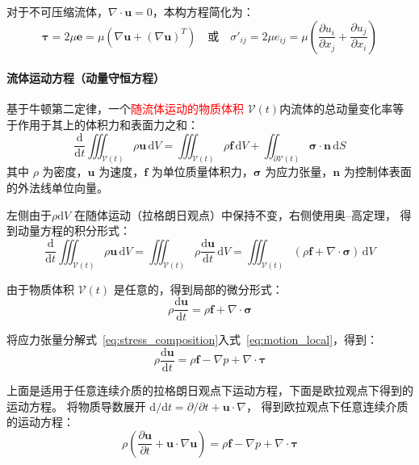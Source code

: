 对于不可压缩流体，$\nabla \cdot \mathbf{u} = 0$，本构方程简化为：
\begin{equation}
\boldsymbol{\tau} = 2\mu \mathbf{e} = \mu \left( \nabla \mathbf{u} + (\nabla \mathbf{u})^T \right)
\quad \text{或} \quad
\sigma'_{ij} = 2\mu e_{ij} =\mu \left( \frac{\partial u_i}{\partial x_j} + \frac{\partial u_j}{\partial x_i} \right)
\end{equation}

\paragraph{流体运动方程（动量守恒方程）}
基于牛顿第二定律，一个\textcolor{red}{随流体运动的物质体积} $\mathcal{V}(t)$内流体的总动量变化率等于作用于其上的体积力和表面力之和：
\begin{equation}
\frac{\mathrm{d}}{\mathrm{d}t} \iiint_{\mathcal{V}(t)} \rho \mathbf{u} \,\mathrm{d}V 
= \iiint_{\mathcal{V}(t)} \rho \mathbf{f} \,\mathrm{d}V + \iint_{\partial \mathcal{V}(t)} \boldsymbol{\sigma} \cdot \mathbf{n} \,\mathrm{d}S
\end{equation}
其中 $\rho$ 为密度，$\mathbf{u}$ 为速度，$\mathbf{f}$ 为单位质量体积力，$\boldsymbol{\sigma}$ 为应力张量，$\mathbf{n}$ 为控制体表面的外法线单位向量。

左侧由于$\rho \mathrm{d}V$ 在随体运动（拉格朗日观点）中保持不变，右侧使用奥--高定理，
得到动量方程的积分形式：
\begin{equation}
\frac{\mathrm{d}}{\mathrm{d}t} \iiint_{\mathcal{V}(t)} \rho \mathbf{u} \,\mathrm{d}V 
= \boxed{\iiint_{\mathcal{V}(t)} \rho \frac{\mathrm{d}\mathbf{u}}{\mathrm{d}t} \,\mathrm{d}V
= \iiint_{\mathcal{V}(t)} \left(\rho \mathbf{f} + \nabla \cdot \boldsymbol{\sigma}\right) \,\mathrm{d}V
}\end{equation}

由于物质体积 $\mathcal{V}(t)$ 是任意的，得到局部的微分形式：
\begin{equation}
\rho \frac{\mathrm{d}\mathbf{u}}{\mathrm{d}t} 
= \rho \mathbf{f} + \nabla \cdot \boldsymbol{\sigma}
\label{eq:motion_local}
\end{equation}

将应力张量分解式~\eqref{eq:stress_composition}入式~\eqref{eq:motion_local}，得到：
\begin{equation}
\rho \frac{\mathrm{d}\mathbf{u}}{\mathrm{d}t} 
= \rho \mathbf{f} - \nabla p + \nabla \cdot \boldsymbol{\tau}
\label{eq:motion_local_pressure}
\end{equation}

上面是适用于任意连续介质的拉格朗日观点下运动方程，下面是欧拉观点下得到的运动方程。
将物质导数展开 $\mathrm{d}/\mathrm{d}t = \partial/\partial t + \mathbf{u}\cdot\nabla$，
得到欧拉观点下任意连续介质的运动方程：
\begin{equation}
\rho \left( \frac{\partial \mathbf{u}}{\partial t} + \mathbf{u}\cdot\nabla \mathbf{u} \right) 
= \rho \mathbf{f} - \nabla p + \nabla \cdot \boldsymbol{\tau}
\label{eq:eulerian_general}
\end{equation}


